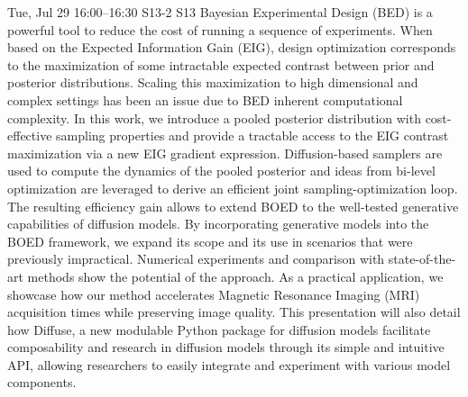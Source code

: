 \documentclass[12pt,lettersize,oneside]{book} %
\begin{document}
\begin{talk}
  {}%
  {}%
  {}%
  {}%
  {}%
  {}%
  {Tue, Jul 29 16:00--16:30}%
  {S13-2}%
  {S13}%
    Bayesian  Experimental Design (BED) is a powerful tool to reduce the cost of running a sequence of experiments.
    When based on the Expected Information Gain (EIG), design optimization corresponds to the maximization of some intractable expected  contrast between prior and posterior distributions.
    Scaling this maximization to high dimensional and complex settings has been an issue due to BED inherent computational complexity.
    In this work, we introduce a pooled posterior distribution with cost-effective sampling properties and provide a tractable access to the EIG contrast maximization via a new EIG gradient expression. Diffusion-based samplers are used to compute the dynamics of the pooled posterior and ideas from bi-level optimization are leveraged to derive an efficient joint sampling-optimization loop.
    The resulting efficiency gain allows to extend BOED to the well-tested generative capabilities of diffusion models.
    By incorporating generative models into the BOED framework, we expand its scope and its use in scenarios that were previously impractical. Numerical experiments and comparison with state-of-the-art methods show the potential of the approach.
    As a practical application, we showcase how our method accelerates Magnetic Resonance Imaging (MRI) acquisition times while preserving image quality.
    This presentation will also detail how Diffuse, a new modulable Python package for diffusion models facilitate composability and research in diffusion models through its simple and intuitive API, allowing researchers to easily integrate and experiment with various model components.

\end{talk}
\end{document}
